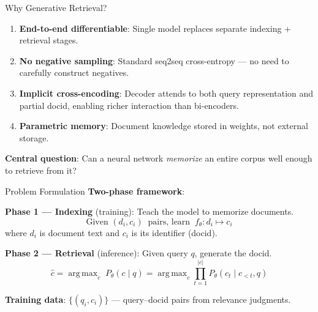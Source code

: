 \documentclass[aspectratio=169,11pt]{beamer}
\DeclareMathOperator*{\argmax}{arg\,max}
\begin{document}

\begin{frame}{Why Generative Retrieval?}
\begin{enumerate}
    \item \textbf{End-to-end differentiable}: Single model replaces separate indexing + retrieval stages.
    \item \textbf{No negative sampling}: Standard seq2seq cross-entropy --- no need to carefully construct negatives.
    \item \textbf{Implicit cross-encoding}: Decoder attends to both query representation and partial docid, enabling richer interaction than bi-encoders.
    \item \textbf{Parametric memory}: Document knowledge stored in weights, not external storage.
\end{enumerate}

\vspace{0.4cm}
\textbf{Central question}: Can a neural network \emph{memorize} an entire corpus well enough to retrieve from it?
\end{frame}


\begin{frame}{Problem Formulation}
\textbf{Two-phase framework}:

\vspace{0.3cm}
\textbf{Phase 1 --- Indexing} (training): Teach the model to memorize documents.
\[
\text{Given } (d_i, c_i) \;\;\text{pairs, learn}\;\; f_\theta : d_i \mapsto c_i
\]
where $d_i$ is document text and $c_i$ is its identifier (docid).

\vspace{0.3cm}
\textbf{Phase 2 --- Retrieval} (inference): Given query $q$, generate the docid.
\[
\hat{c} = \argmax_{c} \; P_\theta(c \mid q) = \argmax_{c} \prod_{t=1}^{|c|} P_\theta(c_t \mid c_{<t}, q)
\]

\vspace{0.3cm}
\textbf{Training data}: $\{(q_i, c_i)\}$ --- query--docid pairs from relevance judgments.
\end{frame}
\end{document}
